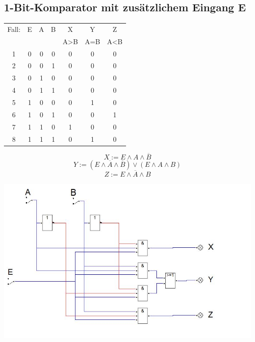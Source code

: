 \documentclass[a4paper, 11pt, fleqn, DIV=10, twoside, BCOR=10mm]{scrreprt}
\begin{document}
\begin{center}
\section{1-Bit-Komparator mit zusätzlichem Eingang E}
\begin{tabular}{c||c|c|c||c|c|c}
Fall:&E&A&B&X&Y&Z\\
 & & & &A>B&A=B&A<B\\
\hline
1&0&0&0&0&0&0\\
2&0&0&1&0&0&0\\
3&0&1&0&0&0&0\\
4&0&1&1&0&0&0\\
5&1&0&0&0&1&0\\
6&1&0&1&0&0&1\\
7&1&1&0&1&0&0\\
8&1&1&1&0&1&0\\
\end{tabular}
\begin{equation}
	X:= E \wedge A \wedge \overline{B}
\end{equation}
\begin{equation}
	Y:= (E \wedge \overline{A} \wedge \overline{B}) \vee (E \wedge A \wedge B)
\end{equation}
\begin{equation}
	Z:= E \wedge \overline{A} \wedge B
\end{equation}
\vspace{10mm}

%
\includegraphics[width=0.9\columnwidth]{DT5Graphics/1_Bit_Komperator_mit_E.jpg}
%

\end{center}
\end{document}
